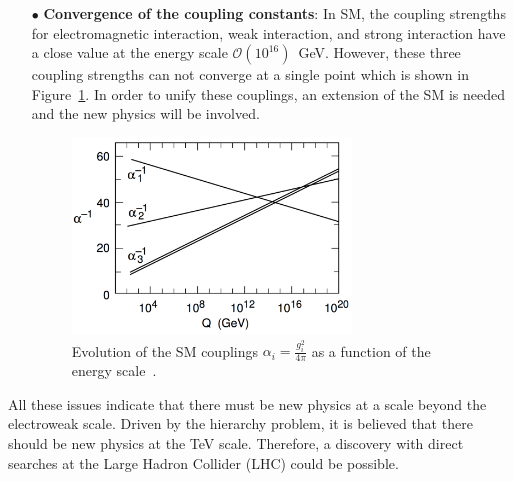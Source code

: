 \begin{enumerate}
\item[$\bullet$]\textbf{Convergence of the coupling constants}: In SM, the coupling strengths for electromagnetic interaction, weak interaction, and strong interaction have a close value at the energy scale $\mathcal{O}(10^{16})$~GeV. However, these three coupling strengths can not converge at a single point which is shown in Figure~\ref{fig:couplings}. In order to unify these couplings, an extension of the SM is needed and the new physics will be involved.

\begin{figure}[!htbp]
	\begin{center}
		\includegraphics[width=0.7\textwidth]{figures/theory/SMcouplings.png}
	\end{center}
	\caption{Evolution of the SM couplings
	$\alpha_i = \frac{g_i^2}{4\pi}$ as a function of the energy scale~\cite{const_running}.
	}
\label{fig:couplings}
\end{figure}
\end{enumerate}
All these issues indicate that there must be new physics at a scale beyond the electroweak scale. Driven by the hierarchy problem, it is believed that there should be new physics at the TeV scale. Therefore, a discovery with direct searches at the Large Hadron Collider (LHC) could be possible.


